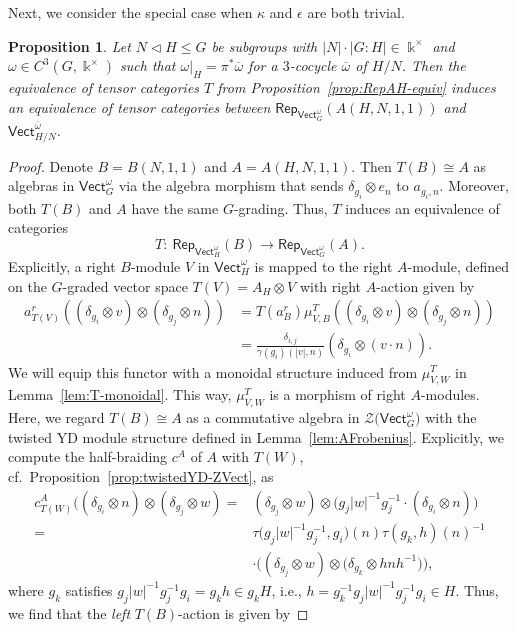 \documentclass[pdftex]{sigma}
\numberwithin{equation}{section}
\newtheorem{Proposition}[Theorem]{Proposition}
 { \theoremstyle{definition}
\newtheorem{Definition}[Theorem]{Definition}
\newtheorem{Note}[Theorem]{Note}
\newtheorem{Notation}[Theorem]{Notation}
\newtheorem{Example}[Theorem]{Example}
\newtheorem{Remark}[Theorem]{Remark} }
\newcommand{\ov}[1]{\overline{#1}}
\newcommand{\Rep}{\mathsf{Rep}}
\newcommand{\Vect}{\mathsf{Vect}}
\newcommand{\cZ}{\mathcal{Z}}
\begin{document}
Next, we consider the special case when $\kappa$ and $\epsilon$ are both trivial.
\begin{Proposition}\label{prop:trivialdata}
 Let $N\triangleleft H\leq G$ be subgroups with $|N|\cdot |G:H|\in \Bbbk^\times$ and $\omega\in C^3(G,\Bbbk^\times)$ such that $\omega|_H=\pi^*\ov{\omega}$ for a $3$-cocycle $\ov{\omega}$ of $H/N$. Then the equivalence of tensor categories $T$ from Proposition~{\rm \ref{prop:RepAH-equiv}} induces an equivalence of tensor categories between $\Rep_{\Vect_G^\omega}(A(H,N,1,1))$ and~$\Vect_{H/N}^{\ov{\omega}}$.
\end{Proposition}
\begin{proof}
Denote $B=B(N,1,1)$ and $A=A(H,N,1,1)$. Then $T(B)\cong A$ as algebras in $\Vect_G^\omega$ via the algebra morphism that sends $\delta_{g_i}\otimes e_n$ to $a_{g_i,n}$. Moreover, both $T(B)$ and $A$ have the same $G$-grading. Thus, $T$ induces an equivalence of categories
\[T\colon\ \Rep_{\Vect_H^\omega}(B)\to \Rep_{\Vect_G^\omega}(A).\]
Explicitly, a right $B$-module $V$ in $\Vect_H^\omega$ is mapped to the right $A$-module, defined on the $G$-graded vector space $T(V)=A_H\otimes V$ with right $A$-action given by
\begin{align*} a_{T(V)}^r((\delta_{g_i}\otimes v)\otimes(\delta_{g_j}\otimes n))&=T(a^r_B)\mu_{V,B}^T((\delta_{g_i}\otimes v)\otimes(\delta_{g_j}\otimes n))\\
&=\frac{\delta_{i,j}}{\gamma(g_i)(|v|,n)}(\delta_{g_i}\otimes (v\cdot n)).
\end{align*}
We will equip this functor with a monoidal structure induced from $\mu_{V,W}^T$ in Lemma~\ref{lem:T-monoidal}. This way, $\mu_{V,W}^T$ is a morphism of right $A$-modules. Here, we regard $T(B)\cong A$ as a commutative algebra in $\cZ\big(\Vect_G^\omega\big)$ with the twisted YD module structure defined in Lemma~\ref{lem:AFrobenius}.
Explicitly, we compute the half-braiding $c^A$ of $A$ with $T(W)$, cf.\ Proposition~\ref{prop:twistedYD-ZVect}, as
\begin{align*}
 c^A_{T(W)}((\delta_{g_i}\otimes n)\otimes (\delta_{g_j}\otimes w)={}& (\delta_{g_j}\otimes w)\otimes \big(g_j|w|^{-1}g_j^{-1}\cdot (\delta_{g_i}\otimes n)\big)\\
 ={}&\tau\big(g_j|w|^{-1}g_j^{-1},g_i\big)(n)\tau(g_k,h)(n)^{-1}\\
 &\cdot \big((\delta_{g_j}\otimes w)\otimes \big(\delta_{g_k}\otimes hnh^{-1}\big)\big),
\end{align*}
where $g_{k}$ satisfies $g_j|w|^{-1}g_j^{-1}g_i=g_kh\in g_kH$, i.e., $h=g_k^{-1}g_j|w|^{-1}g_j^{-1}g_i\in H$. Thus, we find that the \emph{left} $T(B)$-action is given by

\end{proof}
\end{document}
